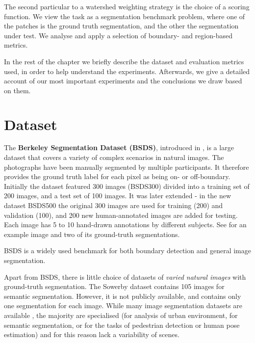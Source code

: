 The second particular to a watershed weighting strategy is the choice of a scoring function. We view the task as a segmentation benchmark problem, where one of the patches is the ground truth segmentation, and the other the segmentation under test. We analyse and apply a selection of boundary- and region-based metrics.

In the rest of the chapter we briefly describe the dataset and evaluation metrics used, in order to help understand the experiments. Afterwards, we give a detailed account of our most important experiments and the conclusions we draw based on them.


\section{Dataset}
\label{sec:ch5-BSDS500-dataset}
The {\bf Berkeley Segmentation Dataset (BSDS)}, introduced in \cite{Martin01}, is a large dataset that covers a variety of complex scenarios in natural images. The photographs have been manually segmented by multiple participants. It therefore provides the ground truth label for each pixel as being on- or off-boundary. Initially the dataset featured 300 images (BSDS300) divided into a training set of 200 images, and a test set of 100 images. It was later extended - in the new dataset BSDS500 \cite{Arbelaez11} the original 300 images are used for training (200) and validation (100), and 200 new human-annotated images are added for testing. Each image has 5 to 10 hand-drawn annotations by different subjects. See  for an example image and two of its ground-truth segmentations. %

BSDS is a widely used benchmark for both boundary detection and general image segmentation. 

Apart from BSDS, there is little choice of datasets of {\it varied natural images} with ground-truth segmentation. The Sowerby dataset \cite{Collins1999sowerby} contains 105 images for semantic segmentation. However, it is not publicly available, and contains only one segmentation for each image. While many image segmentation datasets are available \cite{YACVID2011} , the majority are specialised (\eg for analysis of urban environment, for semantic segmentation, or for the tasks of pedestrian detection or human pose estimation) and for this reason lack a variability of scenes.

